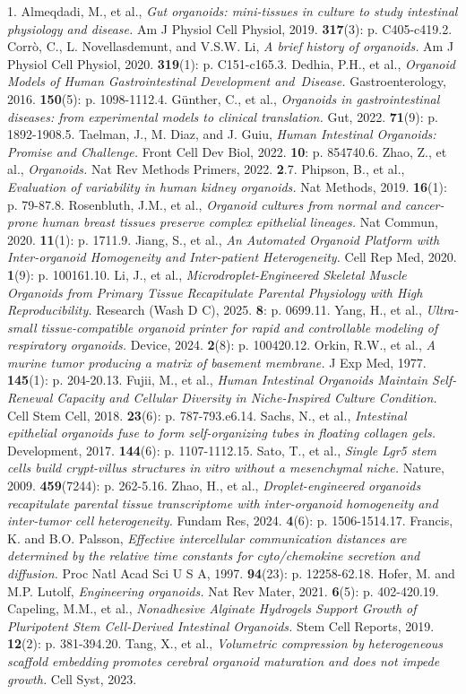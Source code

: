 \documentclass[
]{article}
\begin{document}
1. Almeqdadi, M., et al., \emph{Gut organoids: mini-tissues in culture to study intestinal physiology and disease.} Am J Physiol Cell Physiol, 2019. \textbf{317}(3): p. C405-c419.2. Corrò, C., L. Novellasdemunt, and V.S.W. Li, \emph{A brief history of organoids.} Am J Physiol Cell Physiol, 2020. \textbf{319}(1): p. C151-c165.3. Dedhia, P.H., et al., \emph{Organoid Models of Human Gastrointestinal Development and~Disease.} Gastroenterology, 2016. \textbf{150}(5): p. 1098-1112.4. Günther, C., et al., \emph{Organoids in gastrointestinal diseases: from experimental models to clinical translation.} Gut, 2022. \textbf{71}(9): p. 1892-1908.5. Taelman, J., M. Diaz, and J. Guiu, \emph{Human Intestinal Organoids: Promise and Challenge.} Front Cell Dev Biol, 2022. \textbf{10}: p. 854740.6. Zhao, Z., et al., \emph{Organoids.} Nat Rev Methods Primers, 2022. \textbf{2}.7. Phipson, B., et al., \emph{Evaluation of variability in human kidney organoids.} Nat Methods, 2019. \textbf{16}(1): p. 79-87.8. Rosenbluth, J.M., et al., \emph{Organoid cultures from normal and cancer-prone human breast tissues preserve complex epithelial lineages.} Nat Commun, 2020. \textbf{11}(1): p. 1711.9. Jiang, S., et al., \emph{An Automated Organoid Platform with Inter-organoid Homogeneity and Inter-patient Heterogeneity.} Cell Rep Med, 2020. \textbf{1}(9): p. 100161.10. Li, J., et al., \emph{Microdroplet-Engineered Skeletal Muscle Organoids from Primary Tissue Recapitulate Parental Physiology with High Reproducibility.} Research (Wash D C), 2025. \textbf{8}: p. 0699.11. Yang, H., et al., \emph{Ultra-small tissue-compatible organoid printer for rapid and controllable modeling of respiratory organoids.} Device, 2024. \textbf{2}(8): p. 100420.12. Orkin, R.W., et al., \emph{A murine tumor producing a matrix of basement membrane.} J Exp Med, 1977. \textbf{145}(1): p. 204-20.13. Fujii, M., et al., \emph{Human Intestinal Organoids Maintain Self-Renewal Capacity and Cellular Diversity in Niche-Inspired Culture Condition.} Cell Stem Cell, 2018. \textbf{23}(6): p. 787-793.e6.14. Sachs, N., et al., \emph{Intestinal epithelial organoids fuse to form self-organizing tubes in floating collagen gels.} Development, 2017. \textbf{144}(6): p. 1107-1112.15. Sato, T., et al., \emph{Single Lgr5 stem cells build crypt-villus structures in vitro without a mesenchymal niche.} Nature, 2009. \textbf{459}(7244): p. 262-5.16. Zhao, H., et al., \emph{Droplet-engineered organoids recapitulate parental tissue transcriptome with inter-organoid homogeneity and inter-tumor cell heterogeneity.} Fundam Res, 2024. \textbf{4}(6): p. 1506-1514.17. Francis, K. and B.O. Palsson, \emph{Effective intercellular communication distances are determined by the relative time constants for cyto/chemokine secretion and diffusion.} Proc Natl Acad Sci U S A, 1997. \textbf{94}(23): p. 12258-62.18. Hofer, M. and M.P. Lutolf, \emph{Engineering organoids.} Nat Rev Mater, 2021. \textbf{6}(5): p. 402-420.19. Capeling, M.M., et al., \emph{Nonadhesive Alginate Hydrogels Support Growth of Pluripotent Stem Cell-Derived Intestinal Organoids.} Stem Cell Reports, 2019. \textbf{12}(2): p. 381-394.20. Tang, X., et al., \emph{Volumetric compression by heterogeneous scaffold embedding promotes cerebral organoid maturation and does not impede growth.} Cell Syst, 2023. 
\end{document}
